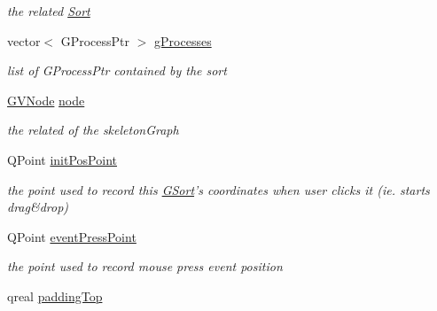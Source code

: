 \begin{DoxyCompactItemize}
\begin{DoxyCompactList}\small\item\em the related \hyperlink{classSort}{Sort} \end{DoxyCompactList}\item 
\hypertarget{classGSort_ae76c81595f0c9d39ef35dfc2b72cd42e}{vector$<$ G\+Process\+Ptr $>$ \hyperlink{classGSort_ae76c81595f0c9d39ef35dfc2b72cd42e}{g\+Processes}}\label{classGSort_ae76c81595f0c9d39ef35dfc2b72cd42e}

\begin{DoxyCompactList}\small\item\em list of G\+Process\+Ptr contained by the sort \end{DoxyCompactList}\item 
\hypertarget{classGSort_a8c14e3fef61ee8c44127f285ab04ca5b}{\hyperlink{structGVNode}{G\+V\+Node} \hyperlink{classGSort_a8c14e3fef61ee8c44127f285ab04ca5b}{node}}\label{classGSort_a8c14e3fef61ee8c44127f285ab04ca5b}

\begin{DoxyCompactList}\small\item\em the related of the skeleton\+Graph \end{DoxyCompactList}\item 
\hypertarget{classGSort_a0985310dc8c415f5ac015cde3a28d6a3}{Q\+Point \hyperlink{classGSort_a0985310dc8c415f5ac015cde3a28d6a3}{init\+Pos\+Point}}\label{classGSort_a0985310dc8c415f5ac015cde3a28d6a3}

\begin{DoxyCompactList}\small\item\em the point used to record this \hyperlink{classGSort}{G\+Sort}'s coordinates when user clicks it (ie. starts drag\&drop) \end{DoxyCompactList}\item 
\hypertarget{classGSort_ad33260958b9f1fdea916b737dedc5ba7}{Q\+Point \hyperlink{classGSort_ad33260958b9f1fdea916b737dedc5ba7}{event\+Press\+Point}}\label{classGSort_ad33260958b9f1fdea916b737dedc5ba7}

\begin{DoxyCompactList}\small\item\em the point used to record mouse press event position \end{DoxyCompactList}\item 
\hypertarget{classGSort_a92702d91a49f5a4aadf387e6b10c664a}{qreal \hyperlink{classGSort_a92702d91a49f5a4aadf387e6b10c664a}{padding\+Top}}\label{classGSort_a92702d91a49f5a4aadf387e6b10c664a}


\end{DoxyCompactItemize}
